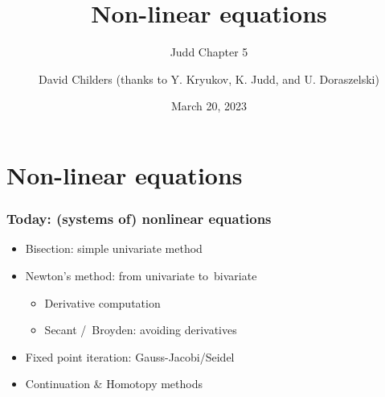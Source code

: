 \documentclass[bigger]{beamer}
\begin{document}
\title[47-809: Non-linear equations]{Non-linear equations}
\subtitle{Judd Chapter 5}
\author[David Childers]{David Childers (thanks to Y. Kryukov, K. Judd, and U. Doraszelski)}
\date[Mar-20]{March 20, 2023}
\maketitle

\section{Non-linear equations}

\begin{frame}%
\frametitle{Today: (systems of) nonlinear equations}

\begin{itemize}
\item Bisection: simple univariate method

\item Newton's method: from univariate to\ bivariate

\begin{itemize}
\item Derivative computation

\item Secant /\ Broyden: avoiding derivatives
\end{itemize}

\item Fixed point iteration: Gauss-Jacobi/Seidel

\item Continuation \& Homotopy methods
\end{itemize}

\end{frame}%
\end{document}
